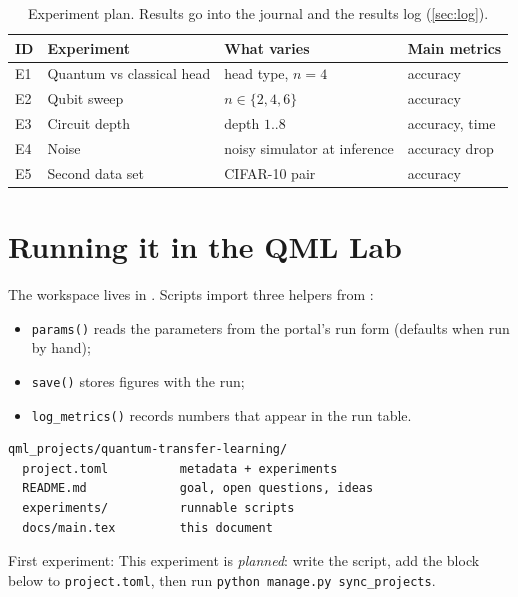 \documentclass[11pt,a4paper]{article}
\begin{document}
\begin{table}[h]
\centering\small
\begin{tabularx}{\linewidth}{@{}l>{\raggedright}X>{\raggedright}X>{\raggedright\arraybackslash}X@{}}
\toprule
ID & Experiment & What varies & Main metrics \\
\midrule
  E1 & Quantum vs classical head & head type, $n=4$ & accuracy \\
  E2 & Qubit sweep & $n\in\{2,4,6\}$ & accuracy \\
  E3 & Circuit depth & depth $1..8$ & accuracy, time \\
  E4 & Noise & noisy simulator at inference & accuracy drop \\
  E5 & Second data set & CIFAR-10 pair & accuracy \\
\bottomrule
\end{tabularx}
\caption{Experiment plan. Results go into the journal and the results log (\cref{sec:log}).}
\end{table}

\section{Running it in the QML Lab}
The workspace lives in . Scripts import three helpers from
:
\begin{itemize}
  \item \texttt{params()} reads the parameters from the portal's run form (defaults when run by hand);
  \item \texttt{save()} stores figures with the run;
  \item \texttt{log\_metrics()} records numbers that appear in the run table.
\end{itemize}

\begin{lstlisting}
qml_projects/quantum-transfer-learning/
  project.toml          metadata + experiments
  README.md             goal, open questions, ideas
  experiments/          runnable scripts
  docs/main.tex         this document
\end{lstlisting}

First experiment: This experiment is \emph{planned}: write the script, add the block below to \texttt{project.toml}, then run \texttt{python manage.py sync\_projects}.
\end{document}
